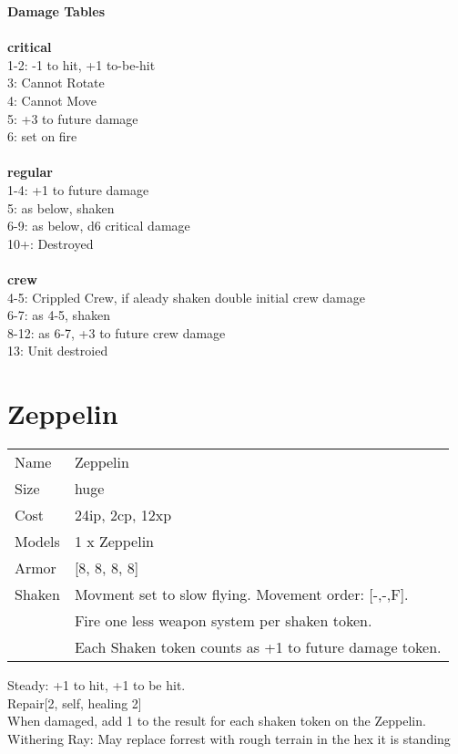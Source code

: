 {\bf Damage Tables} \\
\ \\ {\bf critical } \\
1-2: -1 to hit, +1 to-be-hit \\
3: Cannot Rotate \\
4: Cannot Move \\
5: +3 to future damage \\
6: set on fire \\
\ \\ {\bf regular } \\
1-4: +1 to future damage \\
5: as below, shaken \\
6-9: as below, d6 critical damage \\
10+: Destroyed \\
\ \\ {\bf crew } \\
4-5: Crippled Crew, if aleady shaken double initial crew damage \\
6-7: as 4-5, shaken \\
8-12: as 6-7, +3 to future crew damage \\
13: Unit destroied \\










\pagebreak\pagebreak

\section{ Zeppelin }

\begin{tabular}{ll}
  Name & Zeppelin \\
  Size & huge\\
  Cost & 24ip, 2cp, 12xp\\
  Models & 1 x Zeppelin\\
  Armor & [8, 8, 8, 8]\\
  Shaken & Movment set to slow flying. Movement order: [-,-,F]. \ \\ &Fire one less weapon system per shaken token. \ \\ &Each Shaken token counts as +1 to future damage token.\\
\end{tabular}

\noindent Steady: +1 to hit, +1 to be hit.\\ 
Repair[2, self, healing 2]\\ 
 When damaged, add 1 to the result for each shaken token on the Zeppelin.\\ 
Withering Ray: May replace forrest with rough terrain in the hex it is standing\\ 


